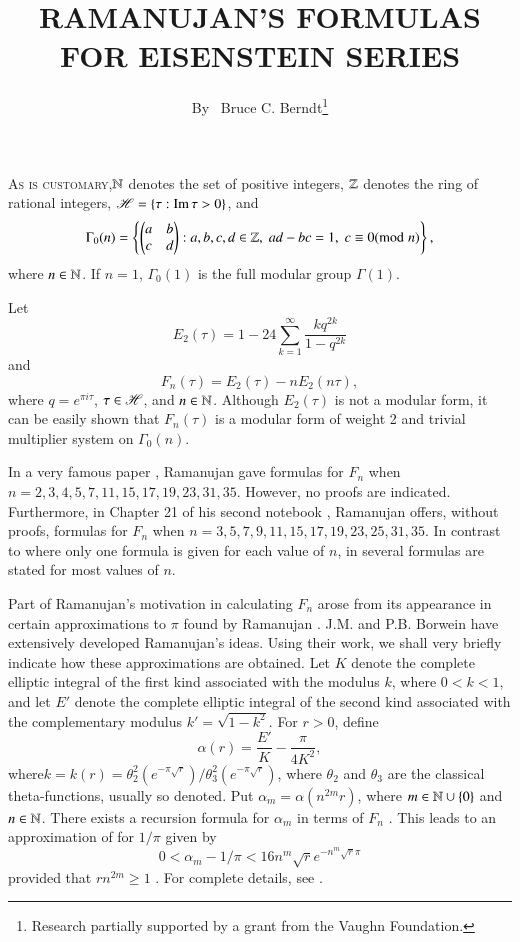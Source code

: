 
\title{RAMANUJAN'S FORMULAS FOR EISENSTEIN SERIES}

\author{By~  Bruce C. Berndt\footnote{Research partially supported by a grant from the Vaughn Foundation.}}

\date{}
\maketitle

\setcounter{page}{27} 
\setcounter{pageoriginal}{22} 

\noindent
\textsc{As is customary},\pageoriginale $\mathbb{N}$ denotes the set of positive integers, $\mathbb{Z}$ denotes the ring of rational integers, $\mathscr{H}= \left\{\tau : \operatorname{Im} \tau > 0 \right\}$, and 
$$
\Gamma_0 (n) = 
\left\{
\begin{pmatrix}
a & b\\
c & d
\end{pmatrix}:
 a, b, c, d \in \mathbb{Z}, \; ad - bc = 1, \; c \equiv 0 ({\rm{mod}}\kern.3em n)
\right\},
$$ 
where $n \in \mathbb{N}$. If $n=1$, $\Gamma_0 (1)$ is the full modular group $\Gamma (1)$. 

Let
$$
E_2 (\tau ) =1 -24 \sum\limits^\infty_{k=1} \frac{kq^{2k}}{1-q^{2k}} 
$$
and 
$$
F_n(\tau) = E_2 (\tau)  -n E_2 (n \tau), 
$$
where $q =e^{\pi i \tau}$, $\tau \in \mathscr{H}$, and $n \in \mathbb{N}$. Although $E_2 (\tau)$ is not a modular form, it can be easily shown that $F_n (\tau)$ is a modular form of weight 2 and trivial multiplier system on $\Gamma_0(n)$. 

In a very famous paper \cite[pp. 23-39]{art3-key8}, Ramanujan gave formulas for $F_n$ when $n = 2, 3,4,5,7,11,15,17,19,23,31,35$. However, no proofs are indicated. Furthermore, in Chapter 21 of his second notebook \cite{art3-key9}, Ramanujan offers, without proofs, formulas for $F_n$ when $n = 3,5,7,9,11, 15, 17, 19, 23, 25, 31, 35$. In contrast to \cite{art3-key8} where only one formula is given for each value of $n$, in \cite{art3-key9} several formulas are stated for most values of $n$.

Part of Ramanujan's motivation in calculating $F_n$ arose from its appearance in certain approximations to $\pi$ found by Ramanujan \cite{art3-key8}. J.M. and P.B. Borwein \cite{art3-key6} have extensively developed Ramanujan's ideas. Using their work, we shall very briefly indicate how these approximations are obtained. Let $K$ denote the complete elliptic integral of the first kind associated with the modulus  $k$, where $0< k <1$, and let $E'$ denote the complete elliptic integral of the second kind associated with the complementary modulus $k' = \sqrt{1-k^2}$. For $r>0$, define
$$
\alpha (r) = \frac{E'}{K} - \frac{\pi}{4K^2},
$$
where\pageoriginale $k = k(r) = \theta^2_2 (e^{-\pi\sqrt{r}})/\theta^2_3(e^{-\pi\sqrt{r}})$, where $\theta_2$ and $\theta_3$ are the classical theta-functions, usually so denoted. Put $\alpha_m= \alpha (n^{2m}r)$, where $m \in \mathbb{N} \cup \{0\}$ and $n \in \mathbb{N}$. There exists a recursion formula for $\alpha_m$ in terms of $F_n$ \cite[p. 158]{art3-key6}. This leads to an approximation of for $1/\pi$ given by
$$
0 < \alpha_m -1/\pi < 16n^m \sqrt{r} e^{-n^m\sqrt{r} \pi}
$$
provided that $rn^{2m} \geqslant 1$ \cite[p. 169]{art3-key6}. For complete details, see \cite{art3-key6}.

